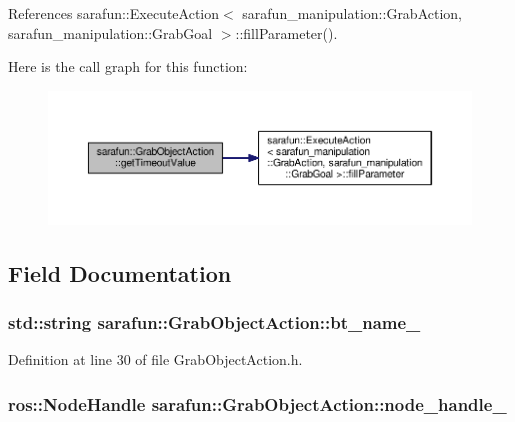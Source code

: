 References sarafun\-::\-Execute\-Action$<$ sarafun\-\_\-manipulation\-::\-Grab\-Action, sarafun\-\_\-manipulation\-::\-Grab\-Goal $>$\-::fill\-Parameter().



Here is the call graph for this function\-:
\nopagebreak
\begin{figure}[H]
\begin{center}
\leavevmode
\includegraphics[width=350pt]{db/d0c/classsarafun_1_1GrabObjectAction_a6e2ee834fda8bd8d0dbdc101c8acdd9c_a6e2ee834fda8bd8d0dbdc101c8acdd9c_cgraph}
\end{center}
\end{figure}




\subsection{Field Documentation}
\hypertarget{classsarafun_1_1GrabObjectAction_a99b30dab79220943e417769f1a3d4f36_a99b30dab79220943e417769f1a3d4f36}{
\subsubsection[{bt\-\_\-name\-\_\-}]{\setlength{\rightskip}{0pt plus 5cm}std\-::string sarafun\-::\-Grab\-Object\-Action\-::bt\-\_\-name\-\_\-\hspace{0.3cm}{\ttfamily [private]}}}\label{classsarafun_1_1GrabObjectAction_a99b30dab79220943e417769f1a3d4f36_a99b30dab79220943e417769f1a3d4f36}


Definition at line 30 of file Grab\-Object\-Action.\-h.

\hypertarget{classsarafun_1_1GrabObjectAction_add955e0266ed5eaf3b6f7b3b3bccd4ae_add955e0266ed5eaf3b6f7b3b3bccd4ae}{
\subsubsection[{node\-\_\-handle\-\_\-}]{\setlength{\rightskip}{0pt plus 5cm}ros\-::\-Node\-Handle sarafun\-::\-Grab\-Object\-Action\-::node\-\_\-handle\-\_\-\hspace{0.3cm}{\ttfamily [private]}}}\label{classsarafun_1_1GrabObjectAction_add955e0266ed5eaf3b6f7b3b3bccd4ae_add955e0266ed5eaf3b6f7b3b3bccd4ae}


